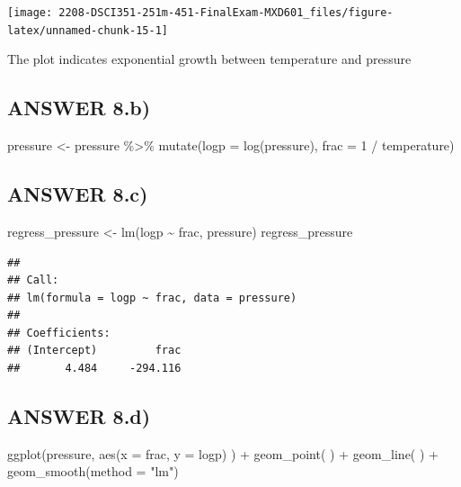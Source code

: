 \documentclass[
]{article}
\newenvironment{Shaded}{\begin{snugshade}}{\end{snugshade}}
\newcommand{\AttributeTok}[1]{\textcolor[rgb]{0.77,0.63,0.00}{#1}}
\newcommand{\DecValTok}[1]{\textcolor[rgb]{0.00,0.00,0.81}{#1}}
\newcommand{\FunctionTok}[1]{\textcolor[rgb]{0.00,0.00,0.00}{#1}}
\newcommand{\NormalTok}[1]{#1}
\newcommand{\OtherTok}[1]{\textcolor[rgb]{0.56,0.35,0.01}{#1}}
\newcommand{\SpecialCharTok}[1]{\textcolor[rgb]{0.00,0.00,0.00}{#1}}
\newcommand{\StringTok}[1]{\textcolor[rgb]{0.31,0.60,0.02}{#1}}
\begin{document}
\begin{center}\texttt{[image: 2208-DSCI351-251m-451-FinalExam-MXD601\_files/figure-latex/unnamed-chunk-15-1]} \end{center}

The plot indicates exponential growth between temperature and pressure

\hypertarget{answer-8.b}{%
\subsection{ANSWER 8.b)}\label{answer-8.b}}

\begin{Shaded}
\begin{Highlighting}[]
\NormalTok{pressure }\OtherTok{\textless{}{-}}\NormalTok{ pressure }\SpecialCharTok{\%\textgreater{}\%} \FunctionTok{mutate}\NormalTok{(}\AttributeTok{logp =} \FunctionTok{log}\NormalTok{(pressure), }\AttributeTok{frac =} \DecValTok{1} \SpecialCharTok{/}\NormalTok{ temperature)}
\end{Highlighting}
\end{Shaded}

\hypertarget{answer-8.c}{%
\subsection{ANSWER 8.c)}\label{answer-8.c}}

\begin{Shaded}
\begin{Highlighting}[]
\NormalTok{regress\_pressure }\OtherTok{\textless{}{-}} \FunctionTok{lm}\NormalTok{(logp }\SpecialCharTok{\textasciitilde{}}\NormalTok{ frac, pressure)}
\NormalTok{regress\_pressure}
\end{Highlighting}
\end{Shaded}

\begin{verbatim}
## 
## Call:
## lm(formula = logp ~ frac, data = pressure)
## 
## Coefficients:
## (Intercept)         frac  
##       4.484     -294.116
\end{verbatim}

\hypertarget{answer-8.d}{%
\subsection{ANSWER 8.d)}\label{answer-8.d}}

\begin{Shaded}
\begin{Highlighting}[]
\FunctionTok{ggplot}\NormalTok{(pressure,}
       \FunctionTok{aes}\NormalTok{(}\AttributeTok{x =}\NormalTok{ frac, }\AttributeTok{y =}\NormalTok{ logp)}
\NormalTok{       ) }\SpecialCharTok{+} \FunctionTok{geom\_point}\NormalTok{(}
\NormalTok{       ) }\SpecialCharTok{+} \FunctionTok{geom\_line}\NormalTok{(}
\NormalTok{       ) }\SpecialCharTok{+} \FunctionTok{geom\_smooth}\NormalTok{(}\AttributeTok{method =} \StringTok{"lm"}\NormalTok{)}
\end{Highlighting}
\end{Shaded}
\end{document}
